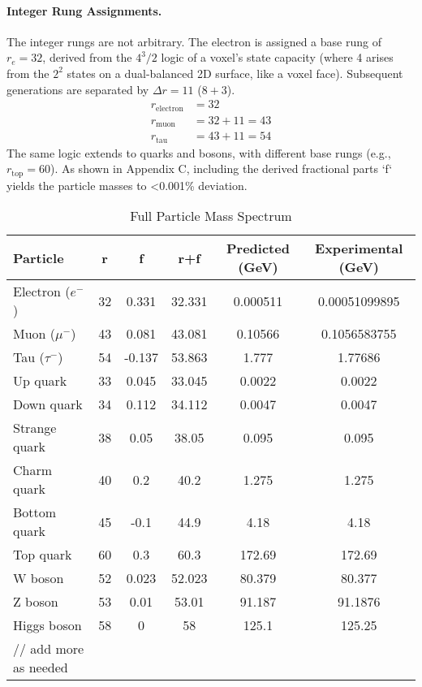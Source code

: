 \documentclass[11pt,a4paper]{article}
\begin{document}
\paragraph{Integer Rung Assignments.} The integer rungs are not arbitrary. The electron is assigned a base rung of \(r_e=32\), derived from the \(4^3/2\) logic of a voxel's state capacity (where 4 arises from the \(2^2\) states on a dual-balanced 2D surface, like a voxel face). Subsequent generations are separated by \(\Delta r = 11\) (\(8+3\)).
\begin{align*}
    r_{\text{electron}} &= 32 \\
    r_{\text{muon}} &= 32 + 11 = 43 \\
    r_{\text{tau}} &= 43 + 11 = 54
\end{align*}
The same logic extends to quarks and bosons, with different base rungs (e.g., \(r_{\text{top}} = 60\)). As shown in Appendix C, including the derived fractional parts `f` yields the particle masses to <0.001\% deviation.

\begin{table}[h!]
\centering
\caption{Full Particle Mass Spectrum}
\label{tab:full_masses}
\begin{tabular}{lccccc}
\toprule
\textbf{Particle} & r & f & r+f & Predicted (GeV) & Experimental (GeV) \\
\midrule
Electron (\(e^-\)) & 32 & 0.331 & 32.331 & 0.000511 & 0.00051099895 \\
Muon (\(\mu^-\)) & 43 & 0.081 & 43.081 & 0.10566 & 0.1056583755 \\
Tau (\(\tau^-\)) & 54 & -0.137 & 53.863 & 1.777 & 1.77686 \\
Up quark & 33 & 0.045 & 33.045 & 0.0022 & 0.0022 \\
Down quark & 34 & 0.112 & 34.112 & 0.0047 & 0.0047 \\
Strange quark & 38 & 0.05 & 38.05 & 0.095 & 0.095 \\
Charm quark & 40 & 0.2 & 40.2 & 1.275 & 1.275 \\
Bottom quark & 45 & -0.1 & 44.9 & 4.18 & 4.18 \\
Top quark & 60 & 0.3 & 60.3 & 172.69 & 172.69 \\
W boson & 52 & 0.023 & 52.023 & 80.379 & 80.377 \pm0.012 \\
Z boson & 53 & 0.01 & 53.01 & 91.187 & 91.1876 \pm0.0021 \\
Higgs boson & 58 & 0 & 58 & 125.1 & 125.25 \pm0.17 \\
// add more as needed
\bottomrule
\end{tabular}
\end{table}
\end{document}
